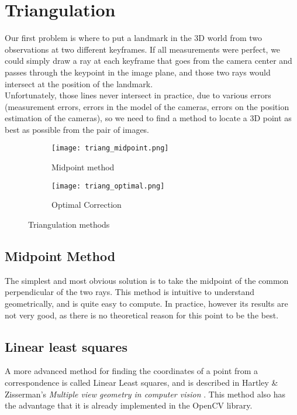 \section{Triangulation}
Our first problem is where to put a landmark in the 3D world from two observations at two different keyframes. If all measurements were perfect, we could simply draw a ray at each keyframe that goes from the camera center and passes through the keypoint in the image plane, and those two rays would intersect at the position of the landmark. \\
Unfortunately, those lines never intersect in practice, due to various errors (measurement errors, errors in the model of the cameras, errors on the position estimation of the cameras), so we need to find a method to locate a 3D point as best as possible from the pair of images.

\begin{figure}[H]
\centering
\vspace{20 mm}
\begin{subfigure}{.5\textwidth}
  \centering
  \texttt{[image: triang\_midpoint.png]}
  \caption{Midpoint method}
  \label{fig:midpoint}
\end{subfigure}%
\begin{subfigure}{.5\textwidth}
  \centering
  \texttt{[image: triang\_optimal.png]}
  \caption{Optimal Correction}
  \label{fig:optimalcorrection}
\end{subfigure}%

\caption{Triangulation methods}
\label{fig:triang}
\end{figure}

\subsection{Midpoint Method}
The simplest and most obvious solution is to take the midpoint of the common perpendicular of the two rays. This method is intuitive to understand geometrically, and is quite easy to compute. In practice, however its results are not very good, as there is no theoretical reason for this point to be the best.

\subsection{Linear least squares}
A more advanced method for finding the coordinates of a point from a correspondence is called Linear Least squares, and is described in Hartley \& Zisserman's \textit{Multiple view geometry in computer vision} \cite{multipleviewgeometry}.
This method also has the advantage that it is already implemented in the OpenCV library.


